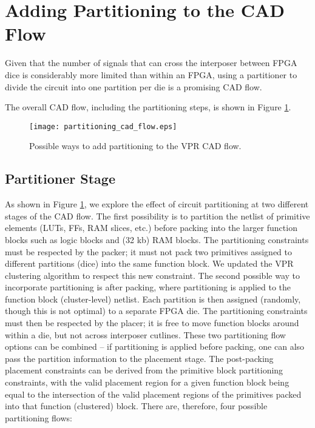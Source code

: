 \section{Adding Partitioning to the CAD Flow}
\label{sec:CADflow}
Given that the number of signals that can cross the interposer between FPGA dice is considerably more limited than within an FPGA, using a partitioner to divide the circuit into one partition per die is a promising CAD flow.

The overall CAD flow, including the partitioning steps, is shown in Figure \ref{fig:partitioning_cad_flow}.
\begin{figure}[!htbp]
\centering
\texttt{[image: partitioning\_cad\_flow.eps]}
\caption{Possible ways to add partitioning to the VPR CAD flow.}
\label{fig:partitioning_cad_flow}
\end{figure}

\subsection{Partitioner Stage}\label{sec:partitioner_stage}
As shown in Figure \ref{fig:partitioning_cad_flow}, we explore the effect of circuit partitioning at two different stages of the CAD flow. The first possibility is to partition the netlist of primitive elements (LUTs, FFs, RAM slices, etc.) before packing into the larger function blocks such as logic blocks and (32 kb) RAM blocks. The partitioning constraints must be respected by the packer; it must not pack two primitives assigned to different partitions (dice) into the same function block. We updated the VPR clustering algorithm to respect this new constraint. The second possible way to incorporate partitioning is after packing, where partitioning is applied to the function block (cluster-level) netlist. Each partition is then assigned (randomly, though this is not optimal) to a separate FPGA die. The partitioning constraints must then be respected by the placer; it is free to move function blocks around within a die, but not across interposer cutlines. These two partitioning flow options can be combined -- if partitioning is applied before packing, one can also pass the partition information to the placement stage. The post-packing placement constraints can be derived from the primitive block partitioning constraints, with the valid placement region for a given function block being equal to the intersection of the valid placement regions of the primitives packed into that function (clustered) block. There are, therefore, four possible partitioning flows:

